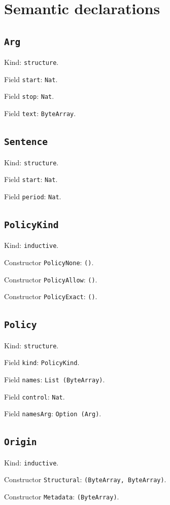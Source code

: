 \documentclass[11pt]{article}
\begin{document}
\section*{Semantic declarations}
\subsection*{\texttt{Arg}}
\noindent Kind: \texttt{structure}.\par
\noindent Field \texttt{start}: \texttt{Nat}.\par
\noindent Field \texttt{stop}: \texttt{Nat}.\par
\noindent Field \texttt{text}: \texttt{ByteArray}.\par
\subsection*{\texttt{Sentence}}
\noindent Kind: \texttt{structure}.\par
\noindent Field \texttt{start}: \texttt{Nat}.\par
\noindent Field \texttt{period}: \texttt{Nat}.\par
\subsection*{\texttt{PolicyKind}}
\noindent Kind: \texttt{inductive}.\par
\noindent Constructor \texttt{PolicyNone}: \texttt{()}.\par
\noindent Constructor \texttt{PolicyAllow}: \texttt{()}.\par
\noindent Constructor \texttt{PolicyExact}: \texttt{()}.\par
\subsection*{\texttt{Policy}}
\noindent Kind: \texttt{structure}.\par
\noindent Field \texttt{kind}: \texttt{PolicyKind}.\par
\noindent Field \texttt{names}: \texttt{List (ByteArray)}.\par
\noindent Field \texttt{control}: \texttt{Nat}.\par
\noindent Field \texttt{namesArg}: \texttt{Option (Arg)}.\par
\subsection*{\texttt{Origin}}
\noindent Kind: \texttt{inductive}.\par
\noindent Constructor \texttt{Structural}: \texttt{(ByteArray, ByteArray)}.\par
\noindent Constructor \texttt{Metadata}: \texttt{(ByteArray)}.\par
\end{document}
